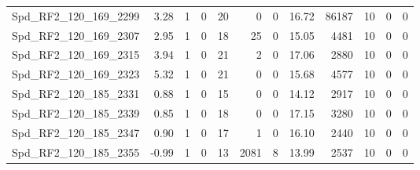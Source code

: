 \begin{longtable}[c]{@{}lrrrrrrrrrrr@{}}
Spd\_RF2\_120\_169\_2299     & 3.28                   & 1                       & 0                       & 20                     & 0                       & 0                       & 16.72                   & 86187                    & 10                       & 0                        & 0                        \\
Spd\_RF2\_120\_169\_2307     & 2.95                   & 1                       & 0                       & 18                     & 25                      & 0                       & 15.05                   & 4481                     & 10                       & 0                        & 0                        \\
Spd\_RF2\_120\_169\_2315     & 3.94                   & 1                       & 0                       & 21                     & 2                       & 0                       & 17.06                   & 2880                     & 10                       & 0                        & 0                        \\
Spd\_RF2\_120\_169\_2323     & 5.32                   & 1                       & 0                       & 21                     & 0                       & 0                       & 15.68                   & 4577                     & 10                       & 0                        & 0                        \\
Spd\_RF2\_120\_185\_2331     & 0.88                   & 1                       & 0                       & 15                     & 0                       & 0                       & 14.12                   & 2917                     & 10                       & 0                        & 0                        \\
Spd\_RF2\_120\_185\_2339     & 0.85                   & 1                       & 0                       & 18                     & 0                       & 0                       & 17.15                   & 3280                     & 10                       & 0                        & 0                        \\
Spd\_RF2\_120\_185\_2347     & 0.90                   & 1                       & 0                       & 17                     & 1                       & 0                       & 16.10                   & 2440                     & 10                       & 0                        & 0                        \\
Spd\_RF2\_120\_185\_2355     & -0.99                  & 1                       & 0                       & 13                     & 2081                    & 8                       & 13.99                   & 2537                     & 10                       & 0                        & 0                        \\

\end{longtable}
